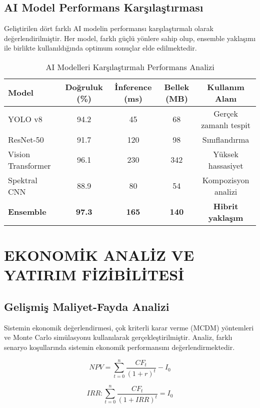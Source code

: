 \documentclass[12pt,a4paper]{article}
\begin{document}
\subsection{AI Model Performans Karşılaştırması}

Geliştirilen dört farklı AI modelin performansı karşılaştırmalı olarak değerlendirilmiştir. Her model, farklı güçlü yönlere sahip olup, ensemble yaklaşımı ile birlikte kullanıldığında optimum sonuçlar elde edilmektedir.

\begin{table}[h]
\centering
\caption{AI Modelleri Karşılaştırmalı Performans Analizi}
\begin{tabular}{lcccc}
\toprule
\textbf{Model} & \textbf{Doğruluk (\%)} & \textbf{İnference (ms)} & \textbf{Bellek (MB)} & \textbf{Kullanım Alanı} \\
\midrule
YOLO v8 & 94.2 & 45 & 68 & Gerçek zamanlı tespit \\
ResNet-50 & 91.7 & 120 & 98 & Sınıflandırma \\
Vision Transformer & 96.1 & 230 & 342 & Yüksek hassasiyet \\
Spektral CNN & 88.9 & 80 & 54 & Kompozisyon analizi \\
\midrule
\textbf{Ensemble} & \textbf{97.3} & \textbf{165} & \textbf{140} & \textbf{Hibrit yaklaşım} \\
\bottomrule
\end{tabular}
\end{table}

\section{EKONOMİK ANALİZ VE YATIRIM FİZİBİLİTESİ}

\subsection{Gelişmiş Maliyet-Fayda Analizi}

Sistemin ekonomik değerlendirmesi, çok kriterli karar verme (MCDM) yöntemleri ve Monte Carlo simülasyonu kullanılarak gerçekleştirilmiştir. Analiz, farklı senaryo koşullarında sistemin ekonomik performansını değerlendirmektedir.

\begin{equation}
NPV = \sum_{t=0}^{n} \frac{CF_t}{(1+r)^t} - I_0
\end{equation}

\begin{equation}
IRR: \sum_{t=0}^{n} \frac{CF_t}{(1+IRR)^t} = I_0
\end{equation}
\end{document}
